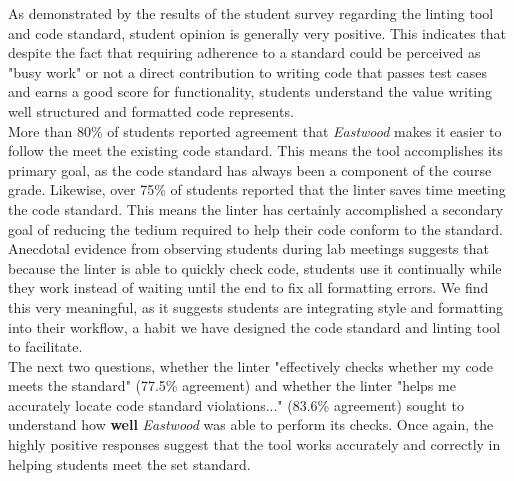 \documentclass[sigconf]{acmart}
\begin{document}
As demonstrated by the results of the student survey regarding the linting tool and code
standard, student opinion is generally very positive. This indicates that despite
the fact that requiring adherence to a standard could be perceived as "busy work" or not
a direct contribution to writing code that passes test cases and earns a good score for
functionality, students understand the value writing well structured and formatted
code represents.
\\

More than 80\% of students reported agreement that \textit{Eastwood} makes
it easier to follow the meet the existing code standard. This means the tool accomplishes
its primary goal, as the code standard has always been a component of the course grade.
Likewise, over 75\% of students reported that the linter saves time meeting the code
standard. This means the linter has certainly accomplished a secondary goal of reducing
the tedium required to help their code conform to the standard. Anecdotal evidence from
observing students during lab meetings suggests that because the linter is able to quickly
check code, students use it continually while they work instead of waiting until the end
to fix all formatting errors. We find this very meaningful, as it suggests students are
integrating style and formatting into their workflow, a habit we have designed the code
standard and linting tool to facilitate.
\\

The next two questions, whether the linter "effectively checks whether my code meets the
standard" (77.5\% agreement) and whether the linter "helps me accurately locate code
standard violations..." (83.6\% agreement) sought to understand how \textbf{well}
\textit{Eastwood} was able to perform its checks. Once again, the highly positive responses
suggest that the tool works accurately and correctly in helping students meet the set
standard.
\\
\end{document}
